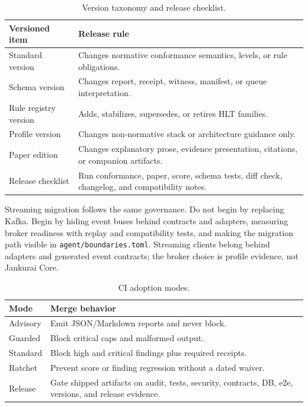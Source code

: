 \begin{table}[t]
\caption{Version taxonomy and release checklist.}
\label{tab:version-taxonomy}
\centering
\scriptsize
\begin{tabularx}{\columnwidth}{L{0.28\columnwidth} Y}
\toprule
\textbf{Versioned item} & \textbf{Release rule} \\
\midrule
Standard version & Changes normative conformance semantics, levels, or rule obligations. \\
Schema version & Changes report, receipt, witness, manifest, or queue interpretation. \\
Rule registry version & Adds, stabilizes, supersedes, or retires HLT families. \\
Profile version & Changes non-normative stack or architecture guidance only. \\
Paper edition & Changes explanatory prose, evidence presentation, citations, or companion artifacts. \\
Release checklist & Run conformance, paper, score, schema tests, diff check, changelog, and compatibility notes. \\
\bottomrule
\end{tabularx}
\end{table}

Streaming migration follows the same governance. Do not begin by replacing Kafka. Begin by hiding event buses behind contracts and adapters, measuring broker readiness with replay and compatibility tests, and making the migration path visible in \texttt{agent/boundaries.toml}. Streaming clients belong behind adapters and generated event contracts; the broker choice is profile evidence, not Jankurai Core.

\begin{table}[t]
\caption{CI adoption modes.}
\label{tab:ci-modes}
\centering
\small
\begin{tabularx}{\columnwidth}{L{0.20\columnwidth} Y}
\toprule
\textbf{Mode} & \textbf{Merge behavior} \\
\midrule
Advisory & Emit JSON/Markdown reports and never block. \\
Guarded & Block critical caps and malformed output. \\
Standard & Block high and critical findings plus required receipts. \\
Ratchet & Prevent score or finding regression without a dated waiver. \\
Release & Gate shipped artifacts on audit, tests, security, contracts, DB, e2e, versions, and release evidence. \\
\bottomrule
\end{tabularx}
\end{table}

